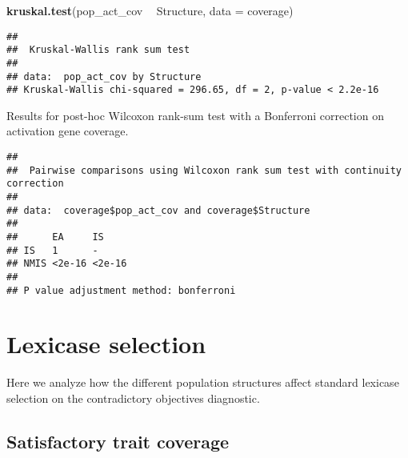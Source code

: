 \documentclass[]{book}
\newenvironment{Shaded}{\begin{snugshade}}{\end{snugshade}}
\newcommand{\DataTypeTok}[1]{\textcolor[rgb]{0.13,0.29,0.53}{#1}}
\newcommand{\KeywordTok}[1]{\textcolor[rgb]{0.13,0.29,0.53}{\textbf{#1}}}
\newcommand{\NormalTok}[1]{#1}
\newcommand{\OperatorTok}[1]{\textcolor[rgb]{0.81,0.36,0.00}{\textbf{#1}}}
\newcommand{\OtherTok}[1]{\textcolor[rgb]{0.56,0.35,0.01}{#1}}
\newcommand{\StringTok}[1]{\textcolor[rgb]{0.31,0.60,0.02}{#1}}
\begin{document}
\begin{Shaded}
\begin{Highlighting}[]
\KeywordTok{kruskal.test}\NormalTok{(pop_act_cov }\OperatorTok{~}\StringTok{ }\NormalTok{Structure, }\DataTypeTok{data =}\NormalTok{ coverage)}
\end{Highlighting}
\end{Shaded}

\begin{verbatim}
## 
##  Kruskal-Wallis rank sum test
## 
## data:  pop_act_cov by Structure
## Kruskal-Wallis chi-squared = 296.65, df = 2, p-value < 2.2e-16
\end{verbatim}

Results for post-hoc Wilcoxon rank-sum test with a Bonferroni correction on activation gene coverage.

\begin{Shaded}
\end{Shaded}

\begin{verbatim}
## 
##  Pairwise comparisons using Wilcoxon rank sum test with continuity correction 
## 
## data:  coverage$pop_act_cov and coverage$Structure 
## 
##      EA     IS    
## IS   1      -     
## NMIS <2e-16 <2e-16
## 
## P value adjustment method: bonferroni
\end{verbatim}

\hypertarget{lexicase-selection-2}{%
\section{Lexicase selection}\label{lexicase-selection-2}}

Here we analyze how the different population structures affect standard lexicase selection on the contradictory objectives diagnostic.

\hypertarget{satisfactory-trait-coverage-2}{%
\subsection{Satisfactory trait coverage}\label{satisfactory-trait-coverage-2}}
\end{document}
